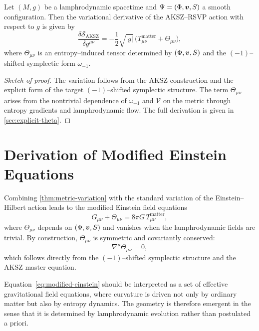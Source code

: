 \begin{theorem}
\label{thm:metric-variation}
Let $(M,g)$ be a lamphrodynamic spacetime and $\Psi=(\Phi,\bm{v},S)$
a smooth configuration. Then the variational derivative of the AKSZ--RSVP action
with respect to $g$ is given by
\[
  \frac{\delta \mathcal{S}_{\mathrm{AKSZ}}}{\delta g^{\mu\nu}}
  = -\frac{1}{2}\sqrt{|g|}\,
    \bigl( T_{\mu\nu}^{\mathrm{matter}} + \Theta_{\mu\nu} \bigr),
\]
where $\Theta_{\mu\nu}$ is an entropy--induced tensor determined by
$(\Phi,\bm{v},S)$ and the $(-1)$–shifted symplectic form
$\omega_{-1}$.
\end{theorem}

\begin{proof}[Sketch of proof]
The variation follows from the AKSZ construction and the explicit form of the
target $(-1)$–shifted symplectic structure. The term $\Theta_{\mu\nu}$ arises
from the nontrivial dependence of $\omega_{-1}$ and $\mathcal{V}$ on the metric
through entropy gradients and lamphrodynamic flow. The full derivation is given
in \cref{sec:explicit-theta}.
\end{proof}

\section{Derivation of Modified Einstein Equations}

Combining \cref{thm:metric-variation} with the standard variation of the
Einstein--Hilbert action leads to the modified Einstein field equations
\begin{equation}
  G_{\mu\nu} + \Theta_{\mu\nu}
  = 8\pi G\, T_{\mu\nu}^{\mathrm{matter}},
  \label{eq:modified-einstein}
\end{equation}
where $\Theta_{\mu\nu}$ depends on $(\Phi,\bm{v},S)$ and vanishes
when the lamphrodynamic fields are trivial. By construction,
$\Theta_{\mu\nu}$ is symmetric and covariantly conserved:
\[
  \nabla^\mu \Theta_{\mu\nu} = 0,
\]
which follows directly from the $(-1)$–shifted symplectic structure and the
AKSZ master equation.

Equation~\eqref{eq:modified-einstein} should be interpreted as a set of
effective gravitational field equations, where curvature is driven not only by
ordinary matter but also by entropy dynamics. The geometry is therefore
emergent in the sense that it is determined by lamphrodynamic evolution rather
than postulated a priori.

